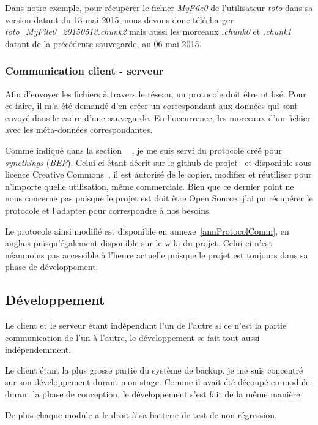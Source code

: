 \documentclass[a4paper,10pt, twoside]{report}
\begin{document}
\begin{spacing}{1.2}
Dans notre exemple, pour r\'ecup\'erer le fichier \textit{MyFile0} de
l'utilisateur \textit{toto}  dans sa version datant du 13 mai 2015, nous devons
donc t\'el\'echarger \textit{toto\_MyFile0\_20150513.chunk2} mais aussi les
morceaux \textit{.chunk0} et \textit{.chunk1} datant de la pr\'ec\'edente
sauvegarde, au 06 mai 2015.

\subsubsection{Communication client - serveur}
Afin d'envoyer les fichiers \`a travers le r\'eseau, un protocole doit \^etre
utilis\'e. Pour ce faire, il m'a \'et\'e demand\'e d'en cr\'eer un correspondant
aux donn\'ees qui sont envoy\'e dans le cadre d'une sauvegarde. En l'occurrence,
les morceaux d'un fichier avec les m\'eta-donn\'ees correspondantes.

Comme indiqu\'e dans la section \flqq~ \frqq, je me
suis servi du protocole cr\'e\'e pour \textit{syncthings} (\textit{BEP}).
Celui-ci \'etant d\'ecrit sur le github de projet~\cite{refBEP} et
disponible sous licence Creative Commons~\cite{refCC4.0}, il est autoris\'e de
le copier, modifier et r\'eutiliser pour n'importe quelle utilisation, m\^eme
commerciale. Bien que ce dernier point ne nous concerne pas puisque le projet
est doit \^etre Open Source, j'ai pu r\'ecup\'erer le protocole et l'adapter
pour correspondre \`a nos besoins.

Le protocole ainsi modifi\'e est disponible en annexe~\ref{annProtocolComm}, en
anglais puisqu'\'egalement disponible sur le wiki du projet. Celui-ci n'est
n\'eanmoins pas accessible \`a l'heure actuelle puisque le projet est toujours
dans sa phase de d\'eveloppement.


\subsection{D\'eveloppement}
Le client et le serveur \'etant ind\'ependant l'un de l'autre si ce n'est la
partie communication de l'un \`a l'autre, le d\'eveloppement se fait tout
aussi ind\'ependemment.

Le client \'etant la plus grosse partie du syst\`eme de backup, je me suis
concentr\'e sur son d\'eveloppement durant mon stage. Comme il avait \'et\'e
d\'ecoup\'e en module durant la phase de conception, le d\'eveloppement s'est
fait de la m\^eme mani\`ere.

De plus chaque module a le droit \`a sa batterie de test de non r\'egression.


\end{spacing}
\end{document}

